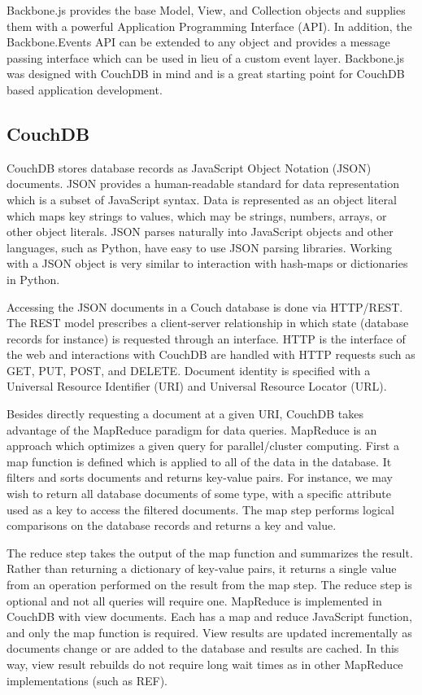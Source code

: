 \documentclass[journal]{IEEEtran}
\begin{document}
Backbone.js provides the base Model, View, and Collection objects and supplies them with a powerful Application Programming Interface (API).
In addition, the Backbone.Events API can be extended to any object and provides a message passing interface
which can be used in lieu of a custom event layer. Backbone.js was designed with CouchDB in mind and is
a great starting point for CouchDB based application development.

\subsection{CouchDB}
CouchDB stores database records as JavaScript Object Notation (JSON) documents. JSON provides a human-readable
standard for data representation which is a subset of JavaScript syntax. Data is represented as an object
literal which maps key strings to values, which may be strings, numbers, arrays, or other object literals. 
JSON parses naturally into JavaScript objects and other languages, such as Python, have easy to use
JSON parsing libraries. Working with a JSON object is very similar to interaction with hash-maps or 
dictionaries in Python.

Accessing the JSON documents in a Couch database is done via HTTP/REST. The REST model prescribes a client-server
relationship in which state (database records for instance) is requested through an interface.
HTTP is the interface of the web and interactions with CouchDB are handled with HTTP
requests such as GET, PUT, POST, and DELETE. Document identity is specified with a Universal Resource Identifier (URI)
and Universal Resource Locator (URL).

Besides directly requesting a document at a given URI, CouchDB takes advantage of the MapReduce paradigm for data
queries. MapReduce is an approach which optimizes a given query for parallel/cluster computing. First a map function
is defined which is applied to all of the data in the database. It filters and sorts documents and returns key-value
pairs. For instance, we may wish to return all database documents of some type, with a specific attribute used as
a key to access the filtered documents. The map step performs logical comparisons on the database records and
returns a key and value.

The reduce step takes the output of the map function and summarizes the result. Rather than returning a dictionary
of key-value pairs, it returns a single value from an operation performed on the result from the map step. The reduce
step is optional and not all queries will require one. MapReduce is implemented in CouchDB with view documents. Each has
a map and reduce JavaScript function, and only the map function is required. View results are updated incrementally as
documents change or are added to the database and results are cached. In this way, view result rebuilds do not require
long wait times as in other MapReduce implementations (such as REF).
\end{document}
